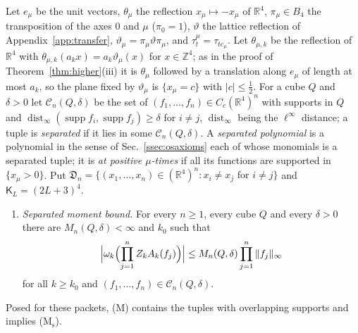 \documentclass[aps,prd,twocolumn,superscriptaddress,nofootinbib,longbibliography,floatfix,amsmath,amssymb,10pt]{revtex4-2}
\theoremstyle{definition}
\theoremstyle{remark}
\newcommand{\R}{\mathbb{R}}
\newcommand{\Z}{\mathbb{Z}}
\newcommand{\dist}{\operatorname{dist}}
\begin{document}
Let $e_\mu$ be the unit vectors, $\theta_\mu$ the reflection
$x_\mu\mapsto-x_\mu$ of $\R^4$, $\pi_\mu\in B_4$ the transposition of the
axes $0$ and $\mu$ ($\pi_0=1$), $\vartheta$ the lattice reflection of
Appendix~\ref{app:transfer}, $\vartheta_\mu=\pi_\mu\vartheta\pi_\mu$, and
$\tau^\mu_t=\tau_{te_\mu}$. Let $\theta_{\mu,k}$ be the reflection of
$\R^4$ with $\theta_{\mu,k}(a_kx)=a_k\vartheta_\mu(x)$ for $x\in\Z^4$; as in
the proof of Theorem~\ref{thm:higher}(iii) it is $\theta_\mu$ followed by a
translation along $e_\mu$ of length at most $a_k$, so the plane fixed by
$\vartheta_\mu$ is $\{x_\mu=c\}$ with $|c|\le\frac12$. For a cube $Q$ and
$\delta>0$ let $\mathcal C_n(Q,\delta)$ be the set of $(f_1,\dots,f_n)\in
C_c(\R^4)^n$ with supports in $Q$ and $\dist_\infty(\operatorname{supp}
f_i,\operatorname{supp}f_j)\ge\delta$ for $i\ne j$, $\dist_\infty$ being
the $\ell^\infty$ distance; a tuple is \emph{separated} if it lies in some
$\mathcal C_n(Q,\delta)$. A \emph{separated polynomial} is a polynomial in
the sense of Sec.~\ref{ssec:osaxioms} each of whose monomials is a separated
tuple; it is \emph{at positive $\mu$-times} if all its functions are
supported in $\{x_\mu>0\}$. Put $\mathfrak D_n=\{(x_1,\dots,x_n)\in(\R^4)^n:
x_i\ne x_j\text{ for }i\ne j\}$ and $\mathsf K_L=(2L+3)^4$.
\begin{enumerate}[label=\textup{(M$_{\mathrm s}$)},leftmargin=*]
\item \emph{Separated moment bound.} For every $n\ge1$, every cube $Q$ and
every $\delta>0$ there are $M_n(Q,\delta)<\infty$ and $k_0$ such that
\[
\Bigl|\omega_k\Bigl(\prod_{j=1}^nZ_kA_k(f_j)\Bigr)\Bigr|\le
M_n(Q,\delta)\prod_{j=1}^n\|f_j\|_\infty
\]
for all $k\ge k_0$ and $(f_1,\dots,f_n)\in\mathcal C_n(Q,\delta)$.
\end{enumerate}
Posed for these packets, (M) contains the tuples with overlapping supports
and implies (M$_{\mathrm s}$).
\end{document}
